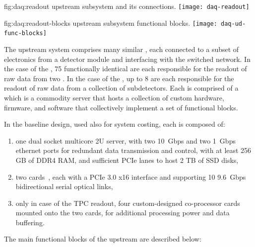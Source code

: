 \begin{dunefigure}{fig:daq:readout}{ upstream  subsystem and its connections.}
  \texttt{[image: daq-readout]}
\end{dunefigure}

\begin{dunefigure}{fig:daq:readout-blocks}{ upstream
     subsystem functional blocks.}
  \texttt{[image: daq-ud-func-blocks]}
\end{dunefigure}

The upstream  system comprises many similar , each
connected to a subset of electronics from a detector module and
interfacing with the  switched network. In the case of the
, 75 functionally identical  are each responsible for the readout of raw data from two
. In the case of the , up to 8  are each responsible for the
readout of raw data from a collection of  subdetectors. 
Each  is comprised of a  which is a commodity server that hosts a
collection of custom hardware, 
firmware, and software that collectively implement a set of functional blocks.

In the baseline design, used also for system costing, each  is composed of:
\begin{enumerate}
\item one dual socket multicore 2U server, with two \SI{10}{Gbps} and two \SI{1}{Gbps} ethernet ports for redundant data transmission and control, with at least 256 GB of DDR4 RAM, and sufficient PCIe lanes to host 2 TB of SSD disks,
\item two  cards~\cite{atlas-felix}, each with a PCIe 3.0 x16 interface and supporting 10 \SI{9.6}{Gbps} bidirectional serial optical links,
\item only in case of the TPC readout, four custom-designed co-processor cards mounted onto the two  cards, for additional processing power and data buffering.

\end{enumerate}

The main functional blocks of the upstream  are described below:

